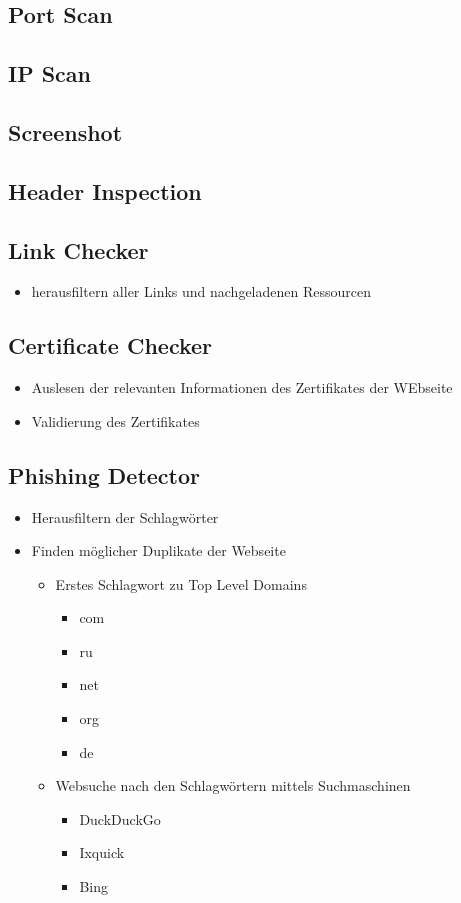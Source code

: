 \subsection{Port Scan}

\subsection{IP Scan}

\subsection{Screenshot}

\subsection{Header Inspection}

\subsection{Link Checker}
\begin{itemize}
  \item herausfiltern aller Links und nachgeladenen Ressourcen
\end{itemize}

\subsection{Certificate Checker}
\begin{itemize}
  \item Auslesen der relevanten Informationen des Zertifikates der WEbseite
  \item Validierung des Zertifikates
\end{itemize}

\subsection{Phishing Detector}
\begin{itemize}
  \item Herausfiltern der Schlagwörter
  \item Finden möglicher Duplikate der Webseite
  \begin{itemize}
    \item Erstes Schlagwort zu Top Level Domains
    \begin{itemize}
      \item com
      \item ru
      \item net
      \item org
      \item de
    \end{itemize}
    \item Websuche nach den Schlagwörtern mittels Suchmaschinen
    \begin{itemize}
      \item DuckDuckGo
      \item Ixquick
      \item Bing
    \end{itemize}
  \end{itemize}
\end{itemize}
